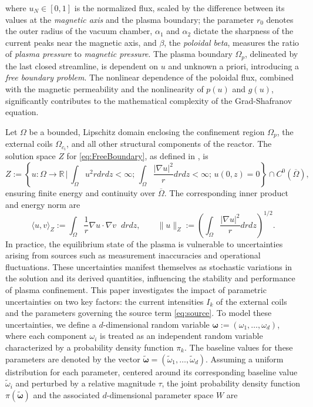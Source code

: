 \documentclass[final,3p,times,11pt]{elsarticle}
\begin{document}
%
where $u_N \in [0,1]$ is the normalized flux, scaled by the difference between its values at the \textit{magnetic axis} and the plasma boundary; the parameter $r_0$ denotes the outer radius of the vacuum chamber, $\alpha_1$ and $\alpha_2$ dictate the sharpness of the current peaks near the magnetic axis, and $\beta$, the \textit{poloidal beta}, measures the ratio of \textit{plasma pressure} to \textit{magnetic pressure}. The plasma boundary $\Omega_p$, delineated by the last closed streamline,  is dependent on $u$ and unknown a priori, introducing a \textit{free boundary problem}. The nonlinear dependence of the poloidal flux, combined with the magnetic permeability and the nonlinearity of $p(u)$ and $g(u)$, significantly contributes to the mathematical complexity of the Grad-Shafranov equation.

Let $\Omega$ be a bounded, Lipschitz domain enclosing the confinement region $\Omega_p$, the external coils $\Omega_{c_i}$, and all other structural components of the reactor.
The solution space $Z$ for \eqref{eq:FreeBoundary}, as defined in \cite{Gr:1999}, is
%
\begin{equation}\label{eq:Soln_space}
    Z:=\left\{u:\Omega\rightarrow \mathbb{R} \,\Bigg| \,\int_\Omega u^2rdrdz<\infty; \,  \int_\Omega\frac{|\nabla u|^2}{r}drdz<\infty; \, u(0,z)=0 \right\}\cap C^0(\overline{\Omega}),
\end{equation}
%
ensuring finite energy and continuity over $\overline\Omega$. The corresponding inner product and energy norm are
%
\[
    \langle u,v\rangle_Z := \int_{\Omega} \frac{1}{r} \nabla u\cdot\nabla v \;\;drdz,\qquad \| u \|_{Z} :=\left(\int_\Omega\frac{|\nabla u|^2}{r} drdz\right)^{1/2}.
\]
%
In practice, the equilibrium state of the plasma is vulnerable to uncertainties arising from sources such as measurement inaccuracies and operational fluctuations. These uncertainties manifest themselves as stochastic variations in the solution and its derived quantities, influencing the stability and performance of plasma confinement. This paper investigates the impact of parametric uncertainties on two key factors: the current intensities $I_k$ of the external coils and the parameters governing the source term \eqref{eq:source}. To model these uncertainties, we define a $d$-dimensional random variable $\boldsymbol \omega :=(\omega_1,\ldots,\omega_d)$,  where each component $\omega_i$ is treated as an independent random variable characterized by a probability density function $\pi_k$. The baseline values for these parameters are denoted by the vector $\boldsymbol{\widetilde{\omega}} = (\widetilde{\omega}_1, \ldots, \widetilde{\omega}_d)$. Assuming a uniform distribution for each parameter, centered around its corresponding baseline value $\widetilde{\omega}_i$ and perturbed by a relative magnitude $\tau$, the joint probability density function $\pi(\boldsymbol{\widetilde{\omega}})$ and the associated $d$-dimensional parameter space $W$ are
\end{document}
